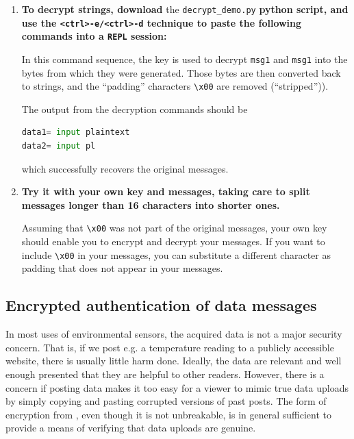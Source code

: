 \begin{enumerate}
	\item \textbf{To decrypt strings, download} the \lstinline{decrypt_demo.py} \textbf{python script, and use the \lstinline{<ctrl>-e/<ctrl>-d} technique to paste the following commands into a \texttt{REPL} session:}


	In this command sequence, the key is used to decrypt \lstinline{msg1} and  \lstinline{msg1} into the bytes from which they were generated.
	Those bytes are then converted back to strings, and the ``padding'' characters \lstinline{\x00} are removed (``stripped'')).

	The output from the decryption commands should be
\begin{lstlisting}[language=Python]
data1= input plaintext
data2= input pl
\end{lstlisting}
	which successfully recovers the original messages.

	\item \textbf{Try it with your own key and messages, taking care to split messages longer than 16 characters into shorter ones.}

	Assuming that \lstinline{\x00} was not part of the original messages, your own key should enable you to encrypt and decrypt your messages.
	If you want to include \lstinline{\x00} in your messages, you can substitute a different character as padding that does not appear in your messages.
\end{enumerate}


\subsection{Encrypted authentication of data messages}
In most uses of environmental sensors, the acquired data is not a major security concern.
That is, if we post e.g. a temperature reading to a publicly accessible website, there is usually little harm done.
Ideally, the data are relevant and well enough presented that they are helpful to other readers.
However, there is a concern if posting data makes it too easy for a viewer to mimic true data uploads by simply copying and pasting corrupted versions of past posts.
The form of encryption from , even though it is not unbreakable, is in general sufficient to provide a means of verifying that data uploads are genuine.

